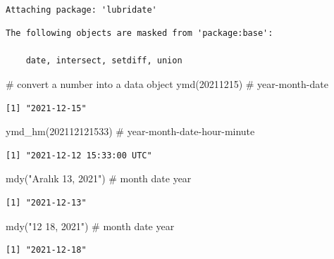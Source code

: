 \documentclass[
  letterpaper,
  DIV=11,
  numbers=noendperiod]{scrreprt}
\newenvironment{Shaded}{\begin{snugshade}}{\end{snugshade}}
\newcommand{\CommentTok}[1]{\textcolor[rgb]{0.37,0.37,0.37}{#1}}
\newcommand{\DecValTok}[1]{\textcolor[rgb]{0.68,0.00,0.00}{#1}}
\newcommand{\FunctionTok}[1]{\textcolor[rgb]{0.28,0.35,0.67}{#1}}
\newcommand{\NormalTok}[1]{\textcolor[rgb]{0.00,0.23,0.31}{#1}}
\newcommand{\StringTok}[1]{\textcolor[rgb]{0.13,0.47,0.30}{#1}}
\begin{document}
\begin{verbatim}

Attaching package: 'lubridate'
\end{verbatim}

\begin{verbatim}
The following objects are masked from 'package:base':

    date, intersect, setdiff, union
\end{verbatim}

\begin{Shaded}
\begin{Highlighting}[]
\CommentTok{\# convert a number into a data object}
\FunctionTok{ymd}\NormalTok{(}\DecValTok{20211215}\NormalTok{) }\CommentTok{\# year{-}month{-}date}
\end{Highlighting}
\end{Shaded}

\begin{verbatim}
[1] "2021-12-15"
\end{verbatim}

\begin{Shaded}
\begin{Highlighting}[]
\FunctionTok{ymd\_hm}\NormalTok{(}\DecValTok{202112121533}\NormalTok{) }\CommentTok{\# year{-}month{-}date{-}hour{-}minute}
\end{Highlighting}
\end{Shaded}

\begin{verbatim}
[1] "2021-12-12 15:33:00 UTC"
\end{verbatim}

\begin{Shaded}
\begin{Highlighting}[]
\FunctionTok{mdy}\NormalTok{(}\StringTok{"Aralık 13, 2021"}\NormalTok{) }\CommentTok{\# month date year}
\end{Highlighting}
\end{Shaded}

\begin{verbatim}
[1] "2021-12-13"
\end{verbatim}

\begin{Shaded}
\begin{Highlighting}[]
\FunctionTok{mdy}\NormalTok{(}\StringTok{"12 18, 2021"}\NormalTok{) }\CommentTok{\# month date year}
\end{Highlighting}
\end{Shaded}

\begin{verbatim}
[1] "2021-12-18"
\end{verbatim}
\end{document}
